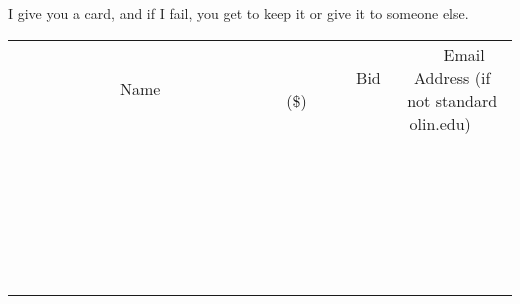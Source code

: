 \documentclass[11pt]{article}
\begin{document}
I give you a card, and if I fail, you get to keep it or give it to someone else.
\\[6ex]
\begin{tabular}{c c c}
~~~~~~~~~~~~~Name~~~~~~~~~~~~~ & ~~~~~~~~~Bid (\$)~~~~~~~~~  & ~~~Email Address (if not standard olin.edu)~~~\\
 & & \\
\hline
 & & \\
\hline
 & & \\
\hline
 & & \\
\hline
 & & \\
\hline
 & & \\
\hline
 & & \\
\hline
 & & \\
\hline
 & & \\
\hline
 & & \\
\hline
 & & \\
\hline
 & & \\
\hline
 & & \\
\hline
 & & \\
\hline
 & & \\
\hline
 & & \\
\hline
 & & \\
\hline
 & & \\
\hline
 & & \\
\hline
 & & \\
\hline
 & & \\
\hline
 & & \\
\hline
 & & \\
\hline
 & & \\
\hline
 & & \\
\hline
 & & \\
\hline
\end{tabular}
\newpage
\end{document}
